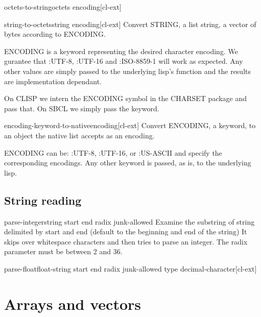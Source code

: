 \documentclass[10pt,english]{book}
\begin{document}
\begin{function}{octets-to-string}{octets encoding}[cl-ext]
  
\end{function}

\begin{function}{string-to-octets}{string encoding}[cl-ext]
  Convert STRING, a list string, a vector of bytes according to ENCODING.

ENCODING is a keyword representing the desired character
encoding. We gurantee that :UTF-8, :UTF-16 and :ISO-8859-1 will
work as expected. Any other values are simply passed to the
underlying lisp's function and the results are implementation
dependant.

On CLISP we intern the ENCODING symbol in the CHARSET package and
pass that. On SBCL we simply pass the keyword.
\end{function}

\begin{function}{encoding-keyword-to-native}{encoding}[cl-ext]
  Convert ENCODING, a keyword, to an object the native list
accepts as an encoding.

ENCODING can be: :UTF-8, :UTF-16, or :US-ASCII and specify the
corresponding encodings. Any other keyword is passed, as is, to
the underlying lisp.
\end{function}

\section{String reading}
\label{sec:string-reading}

\begin{function}{parse-integer}{string \key start end radix junk-allowed}
  Examine the substring of string delimited by start and end
  (default to the beginning and end of the string)  It skips over
  whitespace characters and then tries to parse an integer. The
  radix parameter must be between 2 and 36.
\end{function}

\begin{function}{parse-float}{float-string \key start end radix junk-allowed type decimal-character}[cl-ext]
\end{function}




\chapter{Arrays and vectors}
\label{cha:arrays}
\end{document}

